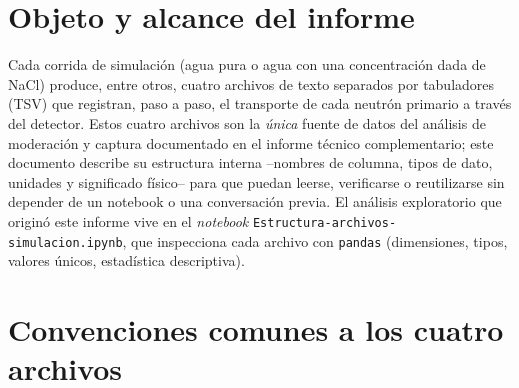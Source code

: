 \documentclass[11pt,a4paper]{article}
\newcommand{\codigo}[1]{\nolinkurl{#1}}
\newcommand{\archivo}[1]{\texttt{#1}} %
\newcommand{\var}[1]{\texttt{#1}}
\begin{document}
\begin{abstract}
Este informe documenta, columna por columna, la estructura de los cuatro archivos TSV que
produce la simulación Geant4/MEIGA del detector Cherenkov de agua (WCD) y que alimentan el
análisis de moderación y captura de neutrones descrito en
\textit{Informe-tecnico-Analisis-Moderacion-Captura-Neutrones}: \archivo{neutrones-incidentes.tsv},
\archivo{pasos-neutrones.tsv}, \archivo{interacciones-neutrones.tsv} y
\archivo{capturas-neutrones.tsv}. Es un documento de referencia --un diccionario de datos-- para
cualquier persona que necesite leer, depurar o extender ese análisis sin tener que releer el
código o volver a inspeccionar los archivos desde cero. Se describen las convenciones comunes a
los cuatro archivos, el significado físico y las unidades de cada columna, ejemplos reales de
filas, los valores categóricos que puede tomar cada campo, y cómo se relacionan entre sí mediante
el identificador \var{run\_id}.
\end{abstract}

\tableofcontents

\section{Objeto y alcance del informe}

Cada corrida de simulación (agua pura o agua con una concentración dada de NaCl) produce, entre
otros, cuatro archivos de texto separados por tabuladores (TSV) que registran, paso a paso, el
transporte de cada neutrón primario a través del detector. Estos cuatro archivos son la
\emph{única} fuente de datos del análisis de moderación y captura documentado en el informe
técnico complementario; este documento describe su estructura interna --nombres de columna, tipos
de dato, unidades y significado físico-- para que puedan leerse, verificarse o reutilizarse sin
depender de un notebook o una conversación previa. El análisis exploratorio que originó este
informe vive en el \textit{notebook} \codigo{Estructura-archivos-simulacion.ipynb}, que inspecciona
cada archivo con \codigo{pandas} (dimensiones, tipos, valores únicos, estadística descriptiva).

\section{Convenciones comunes a los cuatro archivos}
\label{sec:convenciones}
\end{document}
